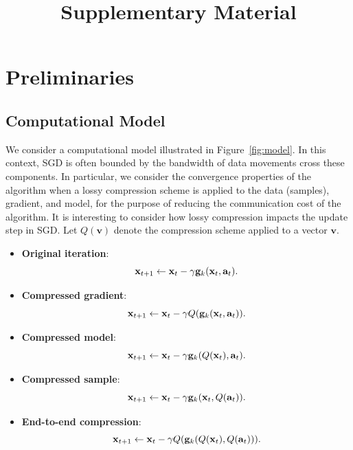 \documentclass{article}
\date{}
\title{\small \bf
Supplementary Material
}
\renewcommand{\vec}[1]{\mathbf{#1}}
\def\g{{\bf g}}
\def\x{{\bf x}}
\begin{document}
\maketitle

\section{Preliminaries}

\subsection{Computational Model}

We consider a computational model illustrated in
Figure~\ref{fig:model}.  
In this context, SGD is often bounded by the bandwidth
of data movements cross these components. 
In particular, we consider the convergence properties of the algorithm when a lossy compression scheme is applied to the data (samples), 
gradient, and model, for the purpose of reducing the communication cost of the algorithm. 
It is interesting to consider how lossy compression impacts the update step in SGD. Let $Q( \vec{v} )$ denote the compression scheme applied to a vector $\vec{v}$. 

\begin{itemize}
    \item \textbf{Original iteration}: $$\x_{t + 1} \leftarrow \x_t - \gamma \g_k (\x_t, \vec{a}_t).$$
    \item \textbf{Compressed gradient}: $$\x_{t + 1} \leftarrow \x_t - \gamma Q( \g_k (\x_t, \vec{a}_t) ).$$
    \item \textbf{Compressed model}: $$\x_{t + 1} \leftarrow \x_t - \gamma \g_k (Q(\x_t), \vec{a}_t).$$
    \item \textbf{Compressed sample}: $$\x_{t + 1} \leftarrow \x_t - \gamma \g_k (\x_t, Q(\vec{a}_t)).$$
    \item \textbf{End-to-end compression}: $$\x_{t + 1} \leftarrow \x_t - \gamma Q(\g_k (Q(\x_t), Q(\vec{a}_t))).$$
\end{itemize}
\end{document}
